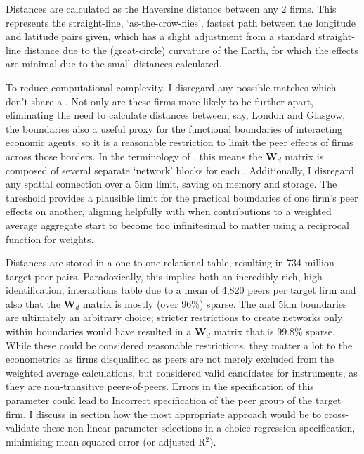 Distances are calculated as the Haversine distance
between any 2 firms. This represents the straight-line, `as-the-crow-flies',
fastest path between the longitude and latitude pairs given,
which has a slight adjustment from a standard straight-line distance
due to the (great-circle) curvature of the Earth, for which the effects are minimal
due to the small distances calculated.
\par
To reduce computational complexity,
I disregard any possible matches which don't share a .
Not only are these firms more likely to be further apart,
eliminating the need to calculate distances between, say,
London and Glasgow,
the  boundaries also a useful proxy for the functional boundaries
of interacting economic agents, so it is a reasonable
restriction to limit the peer effects of firms across those borders.
In the terminology of \cite{Bramoulle2009},
this means the $\mathbf W_d$ matrix is composed of several separate `network'
blocks for each .
Additionally, I disregard any spatial connection over a 5km limit,
saving on memory and storage. The threshold provides a plausible limit
for the practical boundaries of one firm's peer effects on another,
aligning helpfully with when contributions to a weighted average aggregate
start to become too infinitesimal to matter using a reciprocal function for weights.
\par
Distances are stored in a one-to-one relational table, resulting in 734 million target-peer pairs.
Paradoxically, this implies both an incredibly
rich, high-identification, interactions table due to a mean of 4,820 peers per target firm
and also that the $\mathbf W_d$ matrix is mostly (over 96\%) sparse.
The  and 5km boundaries are ultimately an arbitrary choice;
stricter restrictions to create networks only within  boundaries
would have resulted in a $\mathbf W_d$ matrix that is 99.8\% sparse.
While these could be considered reasonable restrictions,
they matter a lot to the econometrics as firms disqualified as peers are not merely
excluded from the weighted average calculations,
but considered valid candidates for instruments, as they are non-transitive peers-of-peers.
Errors in the specification of this parameter could lead to Incorrect
specification of the peer group of the target firm.
I discuss in section \label{ss:param-select-xvalidate} how the most appropriate approach
would be to cross-validate these non-linear parameter selections
in a choice regression specification, minimising mean-squared-error (or adjusted R$^2$).

